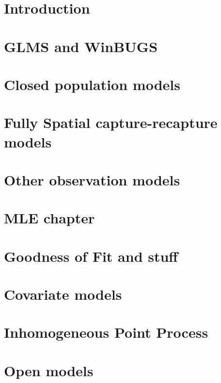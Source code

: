 \documentclass{book}
\begin{document}
\chapter{Introduction}
\label{chapt.intro}

\chapter{GLMS and WinBUGS}
\label{chapt.glms}

\chapter{Closed population models}
\label{chapt.closed}

\chapter{Fully Spatial capture-recapture models}
\label{chapt.scr0}

\chapter{Other observation models}
\label{chapt.poisson}

\chapter{MLE chapter}
\label{chapt.mle}



\chapter{Goodness of Fit and stuff}
\label{chapt.gof}

\chapter{Covariate models}
\label{chapt.covariates}

\chapter{Inhomogeneous Point Process}
\label{chapt.ipp}

\chapter{Open models}
\label{chapt.open}






\end{document}
